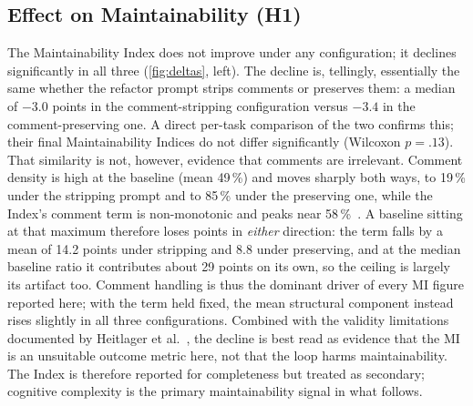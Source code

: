 \subsection{Effect on Maintainability (H1)}
The Maintainability Index does not improve under any configuration; it declines
significantly in all three (\cref{fig:deltas}, left). The
decline is, tellingly, essentially the same whether the refactor prompt
strips comments or preserves them: a median of $-3.0$ points in the
comment-stripping configuration versus $-3.4$ in the comment-preserving one. A
direct per-task comparison of the two confirms this; their final Maintainability
Indices do not differ significantly (Wilcoxon $p=.13$). That similarity is not,
however, evidence that comments are irrelevant. Comment density is high at the
baseline (mean 49\,\%) and moves sharply both ways, to 19\,\% under the stripping
prompt and to 85\,\% under the preserving one, while the Index's comment term is
non-monotonic and peaks near 58\,\%~\citep{coleman1994maintainability,radon_docs}.
A baseline sitting at that maximum therefore loses points in \emph{either}
direction: the term falls by a mean of 14.2 points under stripping and 8.8 under
preserving, and at the median baseline ratio it contributes about 29 points on its
own, so the ceiling is largely its artifact too. Comment handling is thus the dominant driver of every MI figure
reported here; with the term held fixed, the mean structural component instead rises
slightly in all three configurations. Combined with the validity limitations
documented by Heitlager et al.~\citep{heitlager2007maintainability}, the decline is
best read as evidence that the MI is an unsuitable outcome metric here, not that
the loop harms maintainability. The Index is therefore reported for completeness
but treated as secondary; cognitive complexity is the primary maintainability
signal in what follows.

